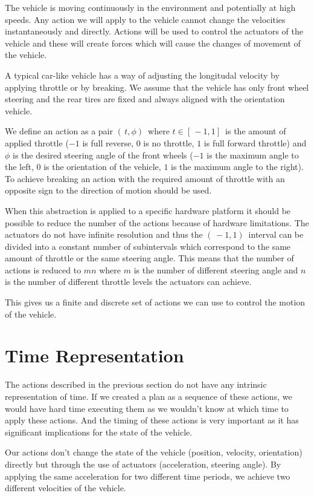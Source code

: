 The vehicle is moving continuously in the environment and potentially at high speeds. Any action we will apply to the vehicle cannot change the velocities instantaneously and directly. Actions will be used to control the actuators of the vehicle and these will create forces which will cause the changes of movement of the vehicle.

A typical car-like vehicle has a way of adjusting the longitudal velocity by applying throttle or by breaking. We assume that the vehicle has only front wheel steering and the rear tires are fixed and always aligned with the orientation vehicle.

We define an action as a pair $( \, t, \phi ) \,$ where $t \in [ \, -1, 1 ] \,$ is the amount of applied throttle ($-1$ is full reverse, $0$ is no throttle, $1$ is full forward throttle) and $\phi$ is the desired steering angle of the front wheels ($-1$ is the maximum angle to the left, $0$ is the orientation of the vehicle, $1$ is the maximum angle to the right). To achieve breaking an action with the required amount of throttle with an opposite sign to the direction of motion should be used.

When this abstraction is applied to a specific hardware platform it should be possible to reduce the number of the actions because of hardware limitations. The actuators do not have infinite resolution and thus the $( \, -1, 1 ) \,$ interval can be divided into a constant number of subintervals which correspond to the same amount of throttle or the same steering angle. This means that the number of actions is reduced to $mn$ where $m$ is the number of different steering angle and $n$ is the number of different throttle levels the actuators can achieve.

This gives us a finite and discrete set of actions we can use to control the motion of the vehicle.

\section{Time Representation}

The actions described in the previous section do not have any intrinsic representation of time. If we created a plan as a sequence of these actions, we would have hard time executing them as we wouldn't know at which time to apply these actions. And the timing of these actions is very important as it has significant implications for the state of the vehicle.

Our actions don't change the state of the vehicle (position, velocity, orientation) directly but through the use of actuators (acceleration, steering angle). By applying the same acceleration for two different time periods, we achieve two different velocities of the vehicle.


